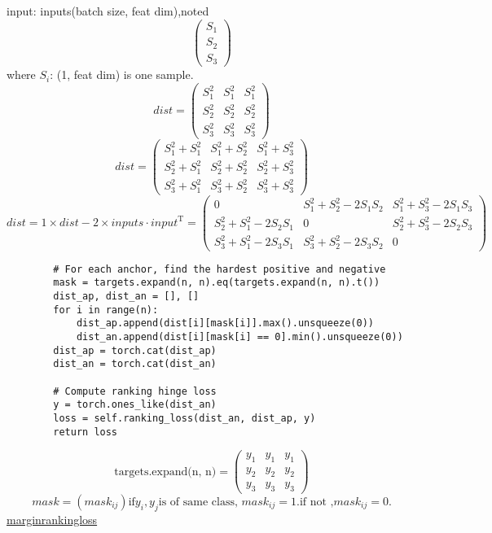\documentclass[UTF8]{ctexart} %
\begin{document}
input: inputs(batch size, feat dim),noted  
 \[\left ( \begin{matrix} S_1 \\ S_2 \\ S_3 \end{matrix} \right) \]
where $S_i$: (1, feat dim) is one sample.
\[ dist = \left ( \begin{matrix} S_1^2 & S_1^2 & S_1^2 \\ S_2^2 & S_2^2 & S_2^2 \\ S_3^2 & S_3^2 & S_3^2 \end{matrix} \right )\]
\[dist = \left ( \begin{matrix}  {S_1^2+S_1^2} &  {S_1^2+S_2^2} &  {S_1^2+S_3^2} \\
     {S_2^2+S_1^2} &  {S_2^2+S_2^2} &  {S_2^2+S_3^2} \\  {S_3^2+S_1^2} &  {S_3^2+S_2^2} &  {S_3^2+S_3^2} \end{matrix} \right )\]
\[dist=1 \times dist - 2 \times inputs \cdot input^\mathrm{T} = \left ( \begin{matrix}  0 &  S_1^2+S_2^2-2S_1S_2 &  S_1^2+S_3^2-2S_1S_3 \\
    S_2^2+S_1^2-2S_2S_1 & 0 &  S_2^2+S_3^2-2S_2S_3 \\  S_3^2+S_1^2-2S_3S_1 &  S_3^2+S_2^2-2S_3S_2 & 0 \end{matrix} \right ) \]

\begin{lstlisting}      
        # For each anchor, find the hardest positive and negative
        mask = targets.expand(n, n).eq(targets.expand(n, n).t())
        dist_ap, dist_an = [], []
        for i in range(n):
            dist_ap.append(dist[i][mask[i]].max().unsqueeze(0))
            dist_an.append(dist[i][mask[i] == 0].min().unsqueeze(0))
        dist_ap = torch.cat(dist_ap)
        dist_an = torch.cat(dist_an)
        
        # Compute ranking hinge loss
        y = torch.ones_like(dist_an)
        loss = self.ranking_loss(dist_an, dist_ap, y)
        return loss

\end{lstlisting}
\[\text{targets.expand(n, n)}= \left(\begin{matrix} y_1 & y_1 & y_1 \\ y_2 & y_2 & y_2 \\y_3 & y_3 & y_3\end{matrix} \right )\]
\[ mask= (mask_{ij}) \text{if} y_i , y_j \text{is of same class, } mask_{ij}=1 . \text{if not ,} mask_{ij}=0 .\]
\href{https://pytorch.org/docs/1.2.0/nn.html?highlight=marginrankingloss#torch.nn.MarginRankingLoss}{marginrankingloss}
\end{document}
